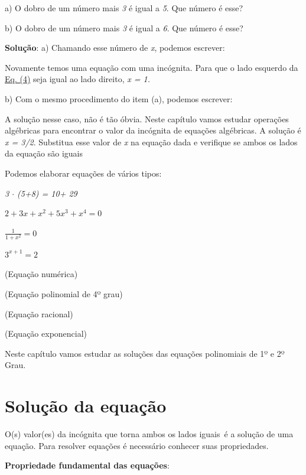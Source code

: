 \begin{texemplo}
a) O dobro de um número mais \textit{3} é igual a \textit{5}. Que número é esse?

b) O dobro de um número mais \textit{3} é igual a \textit{6}. Que número é esse?

\textbf{Solução}: a) Chamando esse número de \textit{x}, podemos escrever:


Novamente temos uma equação com uma incógnita. Para que o lado esquerdo da \hyperref[eqc:4.4]{Eq. (4)} seja igual ao lado direito, \textit{x = 1. }

b) Com o mesmo procedimento do item (a), podemos escrever:


A solução nesse caso, não é tão óbvia. Neste capítulo vamos estudar operações algébricas para encontrar o valor da incógnita de equações algébricas. A solução é \textit{x = 3/2}. Substitua esse valor de \textit{x} na equação dada e verifique se ambos os lados da equação são iguais \qedsymbol{}

\end{texemplo}

Podemos elaborar equações de vários tipos:

\begin{multicols}{2}
\textit{3 $ \cdot $  (5+8) = 10+ 29}

\( 2+3x+x^{2}+5x^{3}+x^{4}=0 \)

\( \frac{1}{1+x^{2}}=0 \)

\( 3^{x+1}=2 \)

(Equação numérica)

(Equação polinomial de 4º grau)

(Equação racional)

(Equação exponencial)
\end{multicols}

Neste capítulo vamos estudar as soluções das equações polinomiais de 1º e 2º Grau.

\section{Solução da equação}

O(s) valor(es) da incógnita que torna ambos os lados iguais~é a  solução de uma equação. Para resolver equações é necessário conhecer suas propriedades.

\textbf{Propriedade fundamental das equações}:

